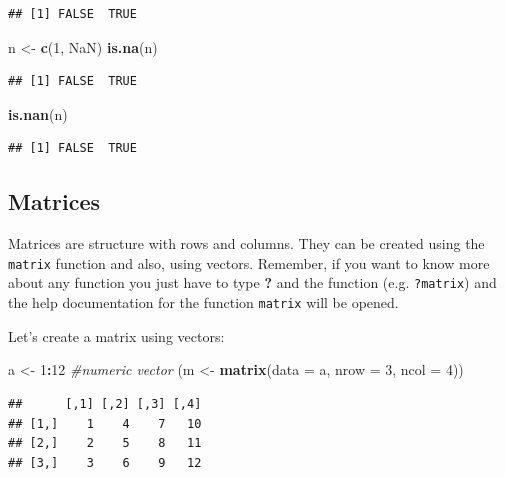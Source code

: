 \documentclass[12pt,graybox,envcountchap,sectrefs]{krantz}
\makeatletter
\newenvironment{Shaded}{\begin{snugshade}}{\end{snugshade}}
\newcommand{\KeywordTok}[1]{\textcolor[rgb]{0.13,0.29,0.53}{\textbf{#1}}}
\newcommand{\DataTypeTok}[1]{\textcolor[rgb]{0.13,0.29,0.53}{#1}}
\newcommand{\DecValTok}[1]{\textcolor[rgb]{0.00,0.00,0.81}{#1}}
\newcommand{\StringTok}[1]{\textcolor[rgb]{0.31,0.60,0.02}{#1}}
\newcommand{\CommentTok}[1]{\textcolor[rgb]{0.56,0.35,0.01}{\textit{#1}}}
\newcommand{\OtherTok}[1]{\textcolor[rgb]{0.56,0.35,0.01}{#1}}
\newcommand{\OperatorTok}[1]{\textcolor[rgb]{0.81,0.36,0.00}{\textbf{#1}}}
\newcommand{\NormalTok}[1]{#1}
\newenvironment{kframe}{%
\medskip{}
\setlength{\fboxsep}{.8em}
 \def\at@end@of@kframe{}%
 \ifinner\ifhmode%
  \def\at@end@of@kframe{\end{minipage}}%
  \begin{minipage}{\columnwidth}%
 \fi\fi%
 \def\FrameCommand##1{\hskip\@totalleftmargin \hskip-\fboxsep
 \colorbox{shadecolor}{##1}\hskip-\fboxsep
     \hskip-\linewidth \hskip-\@totalleftmargin \hskip\columnwidth}%
 \MakeFramed {\advance\hsize-\width
   \@totalleftmargin\z@ \linewidth\hsize
   \@setminipage}}%
 {\par\unskip\endMakeFramed%
 \at@end@of@kframe}
\renewenvironment{Shaded}{\begin{kframe}}{\end{kframe}}
\theoremstyle{definition}
\theoremstyle{definition}
\theoremstyle{definition}
\theoremstyle{remark}
\makeatother
\begin{document}
\begin{verbatim}
## [1] FALSE  TRUE
\end{verbatim}

\begin{Shaded}
\begin{Highlighting}[]
\NormalTok{n <-}\StringTok{ }\KeywordTok{c}\NormalTok{(}\DecValTok{1}\NormalTok{, }\OtherTok{NaN}\NormalTok{)}
\KeywordTok{is.na}\NormalTok{(n)}
\end{Highlighting}
\end{Shaded}

\begin{verbatim}
## [1] FALSE  TRUE
\end{verbatim}

\begin{Shaded}
\begin{Highlighting}[]
\KeywordTok{is.nan}\NormalTok{(n)}
\end{Highlighting}
\end{Shaded}

\begin{verbatim}
## [1] FALSE  TRUE
\end{verbatim}

\subsection{Matrices}\label{matrices}

Matrices are structure with rows and columns. They can be created using
the \texttt{matrix} function and also, using vectors. Remember, if you
want to know more about any function you just have to type \textbf{?}
and the function (e.g. \texttt{?matrix}) and the help documentation for
the function \texttt{matrix} will be opened.

Let's create a matrix using vectors:

\begin{Shaded}
\begin{Highlighting}[]
\NormalTok{a <-}\StringTok{ }\DecValTok{1}\OperatorTok{:}\DecValTok{12}  \CommentTok{#numeric vector}
\NormalTok{(m <-}\StringTok{ }\KeywordTok{matrix}\NormalTok{(}\DataTypeTok{data =}\NormalTok{ a, }\DataTypeTok{nrow =} \DecValTok{3}\NormalTok{, }\DataTypeTok{ncol =} \DecValTok{4}\NormalTok{))}
\end{Highlighting}
\end{Shaded}

\begin{verbatim}
##      [,1] [,2] [,3] [,4]
## [1,]    1    4    7   10
## [2,]    2    5    8   11
## [3,]    3    6    9   12
\end{verbatim}
\end{document}
